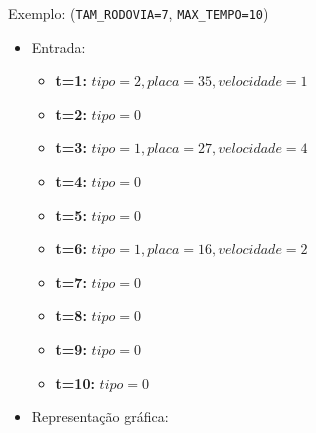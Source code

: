 Exemplo: (\verb|TAM_RODOVIA=7|, \verb|MAX_TEMPO=10|)
\begin{itemize}
    \item Entrada:
    \begin{itemize}
        \item \textbf{t=1:} $tipo=2, placa=35, velocidade=1$
        \item \textbf{t=2:} $tipo=0$
        \item \textbf{t=3:} $tipo=1, placa=27, velocidade=4$
        \item \textbf{t=4:} $tipo=0$
        \item \textbf{t=5:} $tipo=0$
        \item \textbf{t=6:} $tipo=1, placa=16, velocidade=2$
        \item \textbf{t=7:} $tipo=0$
        \item \textbf{t=8:} $tipo=0$
        \item \textbf{t=9:} $tipo=0$
        \item \textbf{t=10:} $tipo=0$
    \end{itemize}

    \item Representação gráfica:


\end{itemize}
